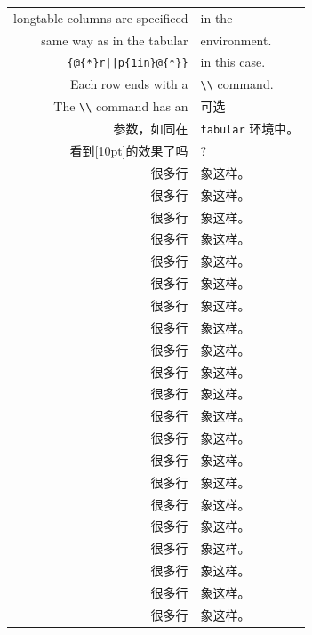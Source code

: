 \documentclass{article}
\begin{document}
\begin{longtable}{@{*}r||p{2in}@{*}}
  longtable columns are specificed & in the \\
  same way as in the tabular       & environment. \\
  \verb!{@{*}r||p{1in}@{*}}!          & in this case. \\
  Each row ends with a             & \verb!\\! command. \\
  The \verb!\\! command has an      & 可选  \\
  参数，如同在                    & \texttt{tabular} 环境中。 \\
  看到[10pt]的效果了吗              & ?   \\  [10pt]
  很多行                            & 象这样。 \\
  很多行                            & 象这样。 \\
  很多行                            & 象这样。 \\
  很多行                            & 象这样。 \\
  很多行                            & 象这样。 \\
  很多行                            & 象这样。 \\
  很多行                            & 象这样。 \\
  很多行                            & 象这样。 \\
  很多行                            & 象这样。 \\
  很多行                            & 象这样。 \\
  很多行                            & 象这样。 \\
  很多行                            & 象这样。 \\
  很多行                            & 象这样。 \\
  很多行                            & 象这样。 \\
  很多行                            & 象这样。 \\
  很多行                            & 象这样。 \\
  很多行                            & 象这样。 \\
  很多行                            & 象这样。 \\
  很多行                            & 象这样。 \\
  很多行                            & 象这样。 \\
  很多行                            & 象这样。 \\

\end{longtable}
\end{document}
